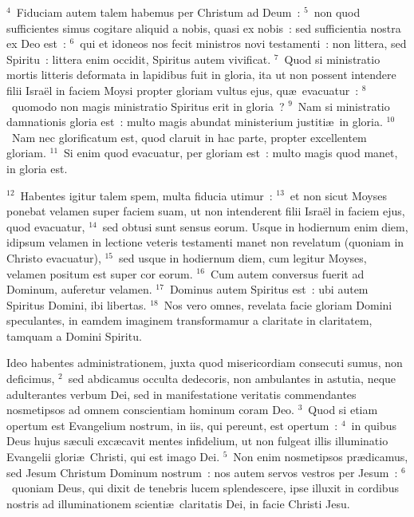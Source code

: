 ${}^{4}$~Fiduciam autem talem habemus per Christum ad Deum~:
${}^{5}$~non quod sufficientes simus cogitare aliquid a nobis, quasi ex nobis~: sed sufficientia nostra ex Deo est~:
${}^{6}$~qui et idoneos nos fecit ministros novi testamenti~: non littera, sed Spiritu~: littera enim occidit, Spiritus autem vivificat.
${}^{7}$~Quod si ministratio mortis litteris deformata in lapidibus fuit in gloria, ita ut non possent intendere filii Isra\"el in faciem Moysi propter gloriam vultus ejus, qu\ae\ evacuatur~:
${}^{8}$~quomodo non magis ministratio Spiritus erit in gloria~?
${}^{9}$~Nam si ministratio damnationis gloria est~: multo magis abundat ministerium justiti\ae\ in gloria.
${}^{10}$~Nam nec glorificatum est, quod claruit in hac parte, propter excellentem gloriam.
${}^{11}$~Si enim quod evacuatur, per gloriam est~: multo magis quod manet, in gloria est.


${}^{12}$~Habentes igitur talem spem, multa fiducia utimur~:
${}^{13}$~et non sicut Moyses ponebat velamen super faciem suam, ut non intenderent filii Isra\"el in faciem ejus, quod evacuatur,
${}^{14}$~sed obtusi sunt sensus eorum. Usque in hodiernum enim diem, idipsum velamen in lectione veteris testamenti manet non revelatum (quoniam in Christo evacuatur),
${}^{15}$~sed usque in hodiernum diem, cum legitur Moyses, velamen positum est super cor eorum.
${}^{16}$~Cum autem conversus fuerit ad Dominum, auferetur velamen.
${}^{17}$~Dominus autem Spiritus est~: ubi autem Spiritus Domini, ibi libertas.
${}^{18}$~Nos vero omnes, revelata facie gloriam Domini speculantes, in eamdem imaginem transformamur a claritate in claritatem, tamquam a Domini Spiritu.

\lettrine[lines=3,image=true,loversize=0.05,lraise=-0.03]{I}{}deo habentes administrationem, juxta quod misericordiam consecuti sumus, non deficimus,
${}^{2}$~sed abdicamus occulta dedecoris, non ambulantes in astutia, neque adulterantes verbum Dei, sed in manifestatione veritatis commendantes nosmetipsos ad omnem conscientiam hominum coram Deo.
${}^{3}$~Quod si etiam opertum est Evangelium nostrum, in iis, qui pereunt, est opertum~:
${}^{4}$~in quibus Deus hujus s\ae culi exc\ae cavit mentes infidelium, ut non fulgeat illis illuminatio Evangelii glori\ae\ Christi, qui est imago Dei.
${}^{5}$~Non enim nosmetipsos pr\ae dicamus, sed Jesum Christum Dominum nostrum~: nos autem servos vestros per Jesum~:
${}^{6}$~quoniam Deus, qui dixit de tenebris lucem splendescere, ipse illuxit in cordibus nostris ad illuminationem scienti\ae\ claritatis Dei, in facie Christi Jesu.


